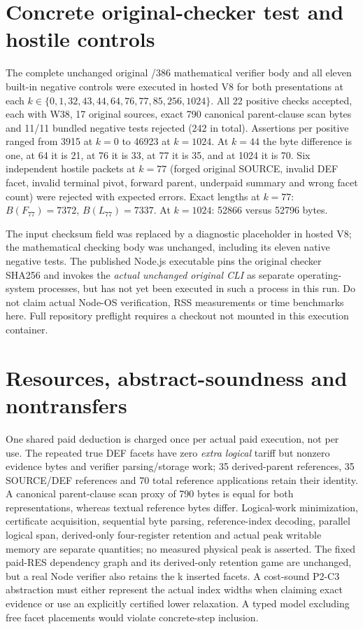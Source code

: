 \documentclass[11pt]{article}
\begin{document}
{\section*{Concrete original-checker test and hostile controls}
The complete unchanged original /386 mathematical verifier body and all eleven built-in negative controls were executed in hosted V8 for both presentations at each $k\in\{0,1,32,43,44,64,76,77,85,256,1024\}$. All 22 positive checks accepted, each with W38, 17 original sources, exact 790 canonical parent-clause scan bytes and 11/11 bundled negative tests rejected (242 in total). Assertions per positive ranged from 3915 at $k=0$ to 46923 at $k=1024$. At $k=44$ the byte difference is one, at 64 it is 21, at 76 it is 33, at 77 it is 35, and at 1024 it is 70. Six independent hostile packets at $k=77$ (forged original SOURCE, invalid DEF facet, invalid terminal pivot, forward parent, underpaid summary and wrong facet count) were rejected with expected errors. Exact lengths at $k=77$: $B(F_{77})=7372$, $B(L_{77})=7337$. At $k=1024$: 52866 versus 52796 bytes.

The input checksum field was replaced by a diagnostic placeholder in hosted V8; the mathematical checking body was unchanged, including its eleven native negative tests. The published Node.js executable pins the original checker SHA256 and invokes the \emph{actual unchanged original CLI} as separate operating-system processes, but has not yet been executed in such a process in this run. Do not claim actual Node-OS verification, RSS measurements or time benchmarks here. Full repository preflight requires a checkout not mounted in this execution container.

\section*{Resources, abstract-soundness and nontransfers}
One shared paid deduction is charged once per actual paid execution, not per use. The repeated true DEF facets have zero \emph{extra logical} tariff but nonzero evidence bytes and verifier parsing/storage work; 35 derived-parent references, 35 SOURCE/DEF references and 70 total reference applications retain their identity. A canonical parent-clause scan proxy of 790 bytes is equal for both representations, whereas textual reference bytes differ. Logical-work minimization, certificate acquisition, sequential byte parsing, reference-index decoding, parallel logical span, derived-only four-register retention and actual peak writable memory are separate quantities; no measured physical peak is asserted. The fixed paid-RES dependency graph and its derived-only retention game are unchanged, but a real Node verifier also retains the k inserted facets. A cost-sound P2-C3 abstraction must either represent the actual index widths when claiming exact evidence or use an explicitly certified lower relaxation. A typed model excluding free facet placements would violate concrete-step inclusion.

}
\end{document}
